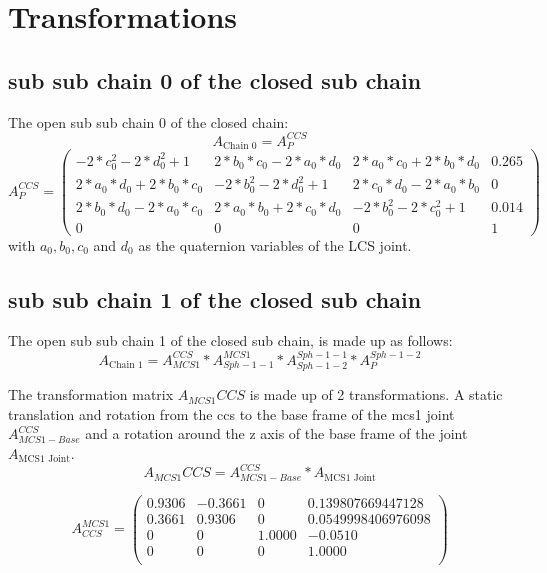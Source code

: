 \documentclass[12pt,a4paper]{article}
\begin{document}
\section{Transformations}
\label{triped_trafo}

\subsection{sub sub chain 0 of the closed sub chain}
The open sub sub chain 0 of the closed chain:
\begin{equation}
    A_{\text{Chain 0}} = A_{P}^{CCS}
\end{equation}
\begin{equation}
    A_{P}^{CCS}
    =
    \begin{pmatrix}
     - 2*c_0^2 - 2*d_0^2 + 1 &     2*b_0*c_0 - 2*a_0*d_0 & 2*a_0*c_0 + 2*b_0*d_0&  0.265 \\
      2*a_0*d_0 + 2*b_0*c_0 & - 2*b_0^2 - 2*d_0^2 + 1 &     2*c_0*d_0 - 2*a_0*b_0 &      0\\
      2*b_0*d_0 - 2*a_0*c_0 &     2*a_0*b_0 + 2*c_0*d_0 & - 2*b_0^2 - 2*c_0^2 + 1 &  0.014 \\
                      0 &                     0 &                     0&      1
    \end{pmatrix}
\end{equation}
with $a_0,b_0,c_0$ and $d_0$ as the quaternion variables of the LCS joint. \\


\subsection{sub sub chain 1 of the closed sub chain}
The open sub sub chain 1 of the closed sub chain, is made up as follows:
\begin{equation}
    A_{\text{Chain 1}} = A_{MCS1}^{CCS} * A_{Sph-1-1}^{MCS1} * A_{Sph-1-2}^{Sph-1-1} * A_{P}^{Sph-1-2}  
\end{equation}

The transformation matrix $A_{MCS1}{CCS}$ is made up of 2 transformations. A static translation and rotation from the ccs to the base frame of the mcs1 joint $A_{MCS1-Base}^{CCS}$ and a rotation around the z axis of the base frame of the joint $A_{\text{MCS1 Joint}}$.
\begin{equation}
    A_{MCS1}{CCS} = A_{MCS1-Base}^{CCS} * A_{\text{MCS1 Joint}}
\end{equation}

\begin{equation}
    A_{CCS}^{MCS1} = 
    \begin{pmatrix}
    0.9306   & -0.3661  &       0   & 0.139807669447128 \\
    0.3661   & 0.9306   &        0  & 0.0549998406976098\\
    0        &     0    &  1.0000   & -0.0510\\
    0       &      0    &      0    & 1.0000\\
    \end{pmatrix}
\end{equation}
\end{document}

